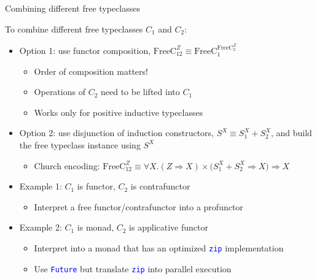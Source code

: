 \documentclass[english,,russian]{beamer}
\begin{document}
\begin{frame}{Combining different free typeclasses}

\vspace{-0.15cm}To combine different free typeclasses $C_{1}$ and
$C_{2}$:
\begin{itemize}
\item Option 1: use functor composition, $\text{FreeC}_{12}^{Z}\equiv\text{FreeC}_{1}^{\text{FreeC}_{2}^{Z}}$
\begin{itemize}
\item Order of composition matters!
\item Operations of $C_{2}$ need to be lifted into $C_{1}$
\item Works only for positive inductive typeclasses
\end{itemize}
\item Option 2: use disjunction of induction constructors, $S^{X}\equiv S_{1}^{X}+S_{2}^{X}$,
and build the free typeclass instance using $S^{X}$
\begin{itemize}
\item Church encoding: $\text{FreeC}_{12}^{Z}\equiv\forall X.\left(Z\Rightarrow X\right)\times\big(S_{1}^{X}+S_{2}^{X}\Rightarrow X\big)\Rightarrow X$
\end{itemize}
\item Example 1: $C_{1}$ is functor, $C_{2}$ is contrafunctor
\begin{itemize}
\item Interpret a free functor/contrafunctor into a profunctor
\end{itemize}
\item Example 2: $C_{1}$ is monad, $C_{2}$ is applicative functor
\begin{itemize}
\item Interpret into a monad that has an optimized \texttt{\textcolor{blue}{\footnotesize{}zip}}
implementation
\item Use \texttt{\textcolor{blue}{\footnotesize{}Future}} but translate
\texttt{\textcolor{blue}{\footnotesize{}zip}} into parallel execution
\end{itemize}
\end{itemize}
\end{frame}
\end{document}
